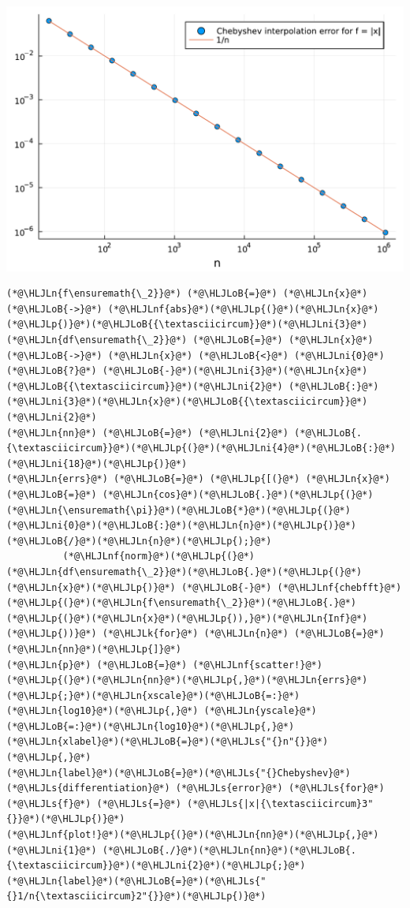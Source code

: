 \documentclass[12pt,a4paper]{article}
\newcommand{\HLJLk}[1]{\textcolor[RGB]{148,91,176}{\textbf{#1}}}
\newcommand{\HLJLn}[1]{#1}
\newcommand{\HLJLnf}[1]{\textcolor[RGB]{66,102,213}{#1}}
\newcommand{\HLJLs}[1]{\textcolor[RGB]{201,61,57}{#1}}
\newcommand{\HLJLni}[1]{\textcolor[RGB]{59,151,46}{#1}}
\newcommand{\HLJLoB}[1]{\textcolor[RGB]{102,102,102}{\textbf{#1}}}
\newcommand{\HLJLp}[1]{#1}
\begin{document}
\includegraphics[width=\linewidth]{jl_P71Faz/Chapter3_19_1.pdf}

\begin{lstlisting}
(*@\HLJLn{f\ensuremath{\_2}}@*) (*@\HLJLoB{=}@*) (*@\HLJLn{x}@*) (*@\HLJLoB{->}@*) (*@\HLJLnf{abs}@*)(*@\HLJLp{(}@*)(*@\HLJLn{x}@*)(*@\HLJLp{)}@*)(*@\HLJLoB{{\textasciicircum}}@*)(*@\HLJLni{3}@*)
(*@\HLJLn{df\ensuremath{\_2}}@*) (*@\HLJLoB{=}@*) (*@\HLJLn{x}@*) (*@\HLJLoB{->}@*) (*@\HLJLn{x}@*) (*@\HLJLoB{<}@*) (*@\HLJLni{0}@*) (*@\HLJLoB{?}@*) (*@\HLJLoB{-}@*)(*@\HLJLni{3}@*)(*@\HLJLn{x}@*)(*@\HLJLoB{{\textasciicircum}}@*)(*@\HLJLni{2}@*) (*@\HLJLoB{:}@*) (*@\HLJLni{3}@*)(*@\HLJLn{x}@*)(*@\HLJLoB{{\textasciicircum}}@*)(*@\HLJLni{2}@*)
(*@\HLJLn{nn}@*) (*@\HLJLoB{=}@*) (*@\HLJLni{2}@*) (*@\HLJLoB{.{\textasciicircum}}@*)(*@\HLJLp{(}@*)(*@\HLJLni{4}@*)(*@\HLJLoB{:}@*)(*@\HLJLni{18}@*)(*@\HLJLp{)}@*)
(*@\HLJLn{errs}@*) (*@\HLJLoB{=}@*) (*@\HLJLp{[(}@*) (*@\HLJLn{x}@*) (*@\HLJLoB{=}@*) (*@\HLJLn{cos}@*)(*@\HLJLoB{.}@*)(*@\HLJLp{(}@*)(*@\HLJLn{\ensuremath{\pi}}@*)(*@\HLJLoB{*}@*)(*@\HLJLp{(}@*)(*@\HLJLni{0}@*)(*@\HLJLoB{:}@*)(*@\HLJLn{n}@*)(*@\HLJLp{)}@*)(*@\HLJLoB{/}@*)(*@\HLJLn{n}@*)(*@\HLJLp{);}@*)
          (*@\HLJLnf{norm}@*)(*@\HLJLp{(}@*)(*@\HLJLn{df\ensuremath{\_2}}@*)(*@\HLJLoB{.}@*)(*@\HLJLp{(}@*)(*@\HLJLn{x}@*)(*@\HLJLp{)}@*) (*@\HLJLoB{-}@*) (*@\HLJLnf{chebfft}@*)(*@\HLJLp{(}@*)(*@\HLJLn{f\ensuremath{\_2}}@*)(*@\HLJLoB{.}@*)(*@\HLJLp{(}@*)(*@\HLJLn{x}@*)(*@\HLJLp{)),}@*)(*@\HLJLn{Inf}@*)(*@\HLJLp{))}@*) (*@\HLJLk{for}@*) (*@\HLJLn{n}@*) (*@\HLJLoB{=}@*) (*@\HLJLn{nn}@*)(*@\HLJLp{]}@*)
(*@\HLJLn{p}@*) (*@\HLJLoB{=}@*) (*@\HLJLnf{scatter!}@*)(*@\HLJLp{(}@*)(*@\HLJLn{nn}@*)(*@\HLJLp{,}@*)(*@\HLJLn{errs}@*)(*@\HLJLp{;}@*)(*@\HLJLn{xscale}@*)(*@\HLJLoB{=:}@*)(*@\HLJLn{log10}@*)(*@\HLJLp{,}@*) (*@\HLJLn{yscale}@*)(*@\HLJLoB{=:}@*)(*@\HLJLn{log10}@*)(*@\HLJLp{,}@*)(*@\HLJLn{xlabel}@*)(*@\HLJLoB{=}@*)(*@\HLJLs{"{}n"{}}@*)(*@\HLJLp{,}@*)
(*@\HLJLn{label}@*)(*@\HLJLoB{=}@*)(*@\HLJLs{"{}Chebyshev}@*) (*@\HLJLs{differentiation}@*) (*@\HLJLs{error}@*) (*@\HLJLs{for}@*) (*@\HLJLs{f}@*) (*@\HLJLs{=}@*) (*@\HLJLs{|x|{\textasciicircum}3"{}}@*)(*@\HLJLp{)}@*)
(*@\HLJLnf{plot!}@*)(*@\HLJLp{(}@*)(*@\HLJLn{nn}@*)(*@\HLJLp{,}@*)(*@\HLJLni{1}@*) (*@\HLJLoB{./}@*)(*@\HLJLn{nn}@*)(*@\HLJLoB{.{\textasciicircum}}@*)(*@\HLJLni{2}@*)(*@\HLJLp{;}@*)(*@\HLJLn{label}@*)(*@\HLJLoB{=}@*)(*@\HLJLs{"{}1/n{\textasciicircum}2"{}}@*)(*@\HLJLp{)}@*)
\end{lstlisting}
\end{document}
